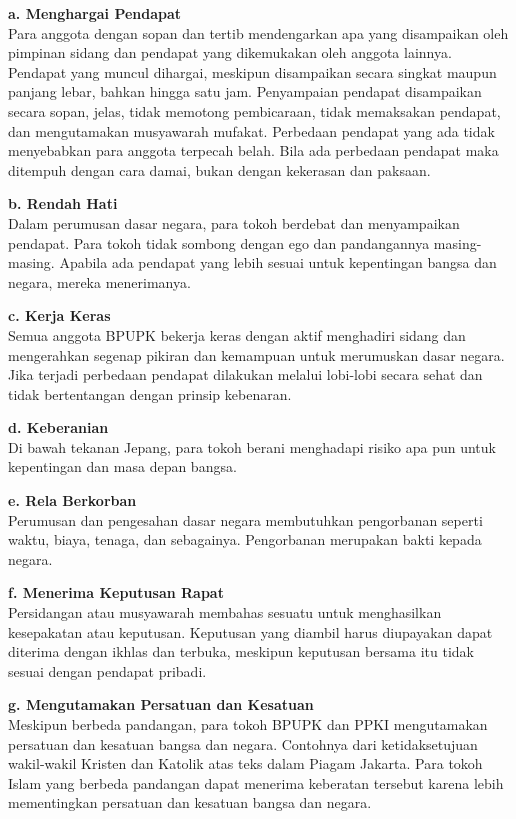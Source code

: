 \documentclass[12pt,a4paper]{article}
\begin{document}
\textbf{a. Menghargai Pendapat} \\
Para anggota dengan sopan dan tertib mendengarkan apa yang disampaikan oleh pimpinan sidang dan pendapat yang dikemukakan oleh anggota lainnya. Pendapat yang muncul dihargai, meskipun disampaikan secara singkat maupun panjang lebar, bahkan hingga satu jam. Penyampaian pendapat disampaikan secara sopan, jelas, tidak memotong pembicaraan, tidak memaksakan pendapat, dan mengutamakan musyawarah mufakat. Perbedaan pendapat yang ada tidak menyebabkan para anggota terpecah belah. Bila ada perbedaan pendapat maka ditempuh dengan cara damai, bukan dengan kekerasan dan paksaan.

\textbf{b. Rendah Hati} \\
Dalam perumusan dasar negara, para tokoh berdebat dan menyampaikan pendapat. Para tokoh tidak sombong dengan ego dan pandangannya masing-masing. Apabila ada pendapat yang lebih sesuai untuk kepentingan bangsa dan negara, mereka menerimanya.

\textbf{c. Kerja Keras} \\
Semua anggota BPUPK bekerja keras dengan aktif menghadiri sidang dan mengerahkan segenap pikiran dan kemampuan untuk merumuskan dasar negara. Jika terjadi perbedaan pendapat dilakukan melalui lobi-lobi secara sehat dan tidak bertentangan dengan prinsip kebenaran.

\textbf{d. Keberanian} \\
Di bawah tekanan Jepang, para tokoh berani menghadapi risiko apa pun untuk kepentingan dan masa depan bangsa.

\textbf{e. Rela Berkorban} \\
Perumusan dan pengesahan dasar negara membutuhkan pengorbanan seperti waktu, biaya, tenaga, dan sebagainya. Pengorbanan merupakan bakti kepada negara.

\textbf{f. Menerima Keputusan Rapat} \\
Persidangan atau musyawarah membahas sesuatu untuk menghasilkan kesepakatan atau keputusan. Keputusan yang diambil harus diupayakan dapat diterima dengan ikhlas dan terbuka, meskipun keputusan bersama itu tidak sesuai dengan pendapat pribadi.

\textbf{g. Mengutamakan Persatuan dan Kesatuan} \\
Meskipun berbeda pandangan, para tokoh BPUPK dan PPKI mengutamakan persatuan dan kesatuan bangsa dan negara. Contohnya dari ketidaksetujuan wakil-wakil Kristen dan Katolik atas teks dalam Piagam Jakarta. Para tokoh Islam yang berbeda pandangan dapat menerima keberatan tersebut karena lebih mementingkan persatuan dan kesatuan bangsa dan negara.
\end{document}
